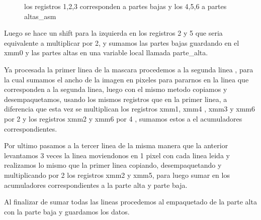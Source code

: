 \begin{figure}[ht]
\caption{los registros 1,2,3 corresponden a partes bajas y los 4,5,6 a partes altas\_asm}
\label{est:m-dos}
\end{figure}

Luego se hace un shift para la izquierda en los registros 2 y 5 que seria equivalente a multiplicar por 2, y sumamos las partes bajas guardando en el xmm0  y las partes altas en una variable local llamada parte_alta.

Ya procesada la primer linea de la mascara procedemos a la segunda linea , para la cual sumamos el ancho de la imagen en pixeles para pararnos en la linea que corresponden a la segunda linea, luego con el mismo metodo copiamos y desempaquetamos, usando los mismos registros que en la primer linea, a diferencia que esta vez se multiplican los registros xmm1, xmm4 , xmm3 y xmm6 por 2 y los registros xmm2 y xmm6 por 4 , sumamos estos a el acumuladores correspondientes.
 
Por ultimo pasamos a la tercer linea de la misma manera que la anterior levantamos 3 veces la linea moviendonos en 1 pixel con cada linea leida y realizamos lo mismo que la primer linea copiando, desempaquetando y multiplicando por 2 los registros xmm2 y xmm5, para luego sumar en los acumuladores correspondientes a la parte alta y parte baja.

Al finalizar de sumar todas las lineas procedemos al empaquetado de la parte alta con la parte baja y guardamos los datos.

